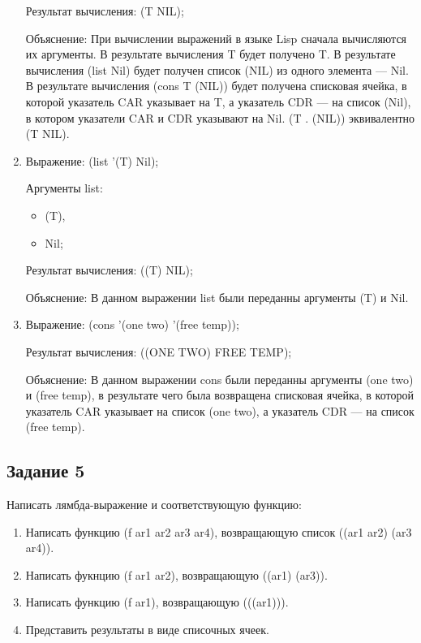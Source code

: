 \documentclass[a4paper,oneside,14pt]{extarticle}
\begin{document}
\begin{enumerate}
        Результат вычисления: (T NIL);

        Объяснение: При вычислении выражений в языке Lisp сначала вычисляются их аргументы. В результате вычисления T будет получено T. В результате вычисления (list Nil) будет получен список (NIL) из одного элемента --- Nil. В результате вычисления (cons T (NIL)) будет получена списковая ячейка, в которой указатель CAR указывает на T, а указатель CDR --- на список (Nil), в котором указатели CAR и CDR указывают на Nil. (T . (NIL)) эквивалентно (T NIL).

    \item 
        Выражение: (list '(T) Nil);

        Аргументы list:
        \begin{itemize}
            \item (T),
            \item Nil;
        \end{itemize}

        Результат вычисления: ((T) NIL);

        Объяснение: В данном выражении list были переданны аргументы (T) и Nil.

    \item 
        Выражение: (cons '(one two) '(free temp));

        Результат вычисления: ((ONE TWO) FREE TEMP);

        Объяснение: В данном выражении cons были переданны аргументы (one two) и (free temp), в результате чего была возвращена списковая ячейка, в которой указатель CAR указывает на список (one two), а указатель CDR --- на список (free temp).

\end{enumerate}

\newpage
\subsection{Задание 5}

Написать лямбда-выражение и соответствующую функцию:
\begin{enumerate}
    \item Написать функцию (f ar1 ar2 ar3 ar4), возвращающую список ((ar1 ar2) (ar3 ar4)).
    \item Написать фукнцию (f ar1 ar2), возвращающую ((ar1) (ar3)).
    \item Написать функцию (f ar1), возвращающую (((ar1))).
    \item Представить результаты в виде списочных ячеек.
\end{enumerate}
\end{document}
